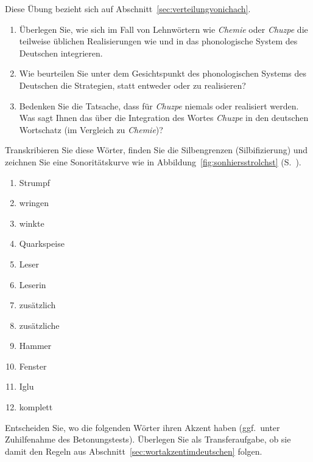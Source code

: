 \Uebung[\tristar] \label{u43} Diese Übung bezieht sich auf Abschnitt~\ref{sec:verteilungvonichach}.

\begin{enumerate}\Lf
  \item Überlegen Sie, wie sich im Fall von Lehnwörtern wie \textit{Chemie} oder \textit{Chuzpe} die teilweise üblichen Realisierungen wie \textipa{[\c{c}emi:]} und \textipa{[XU\t{ts}p@]} in das phonologische System des Deutschen integrieren.
  \item Wie beurteilen Sie unter dem Gesichtspunkt des phonologischen Systems des Deutschen die Strategien, statt \textipa{[\c{c}emi:]} entweder \textipa{[Semi:]} oder \textipa{[kemi:]} zu realisieren?
  \item Bedenken Sie die Tatsache, dass für \textit{Chuzpe} niemals \textipa{[SU\t{ts}p@]} oder \textipa{[kU\t{ts}p@]} realisiert werden.
    Was sagt Ihnen das über die Integration des Wortes \textit{Chuzpe} in den deutschen Wortschatz (im Vergleich zu \textit{Chemie})?
\end{enumerate}

\Uebung \label{u44} Transkribieren Sie diese Wörter, finden Sie die Silbengrenzen (Silbifizierung) und zeichnen Sie eine Sonoritätskurve wie in Abbildung~\ref{fig:sonhiersstrolchst} (S.~\pageref{fig:sonhiersstrolchst}).

\begin{enumerate}\Lf
  \item Strumpf
  \item wringen
  \item winkte
  \item Quarkspeise
  \item Leser
  \item Leserin
  \item zusätzlich
  \item zusätzliche
  \item Hammer
  \item Fenster
  \item Iglu
  \item komplett
\end{enumerate}

\Uebung \label{u45} Entscheiden Sie, wo die folgenden Wörter ihren Akzent haben (ggf.\ unter Zuhilfenahme des Betonungstests).
Überlegen Sie als Transferaufgabe, ob sie damit den Regeln aus Abschnitt~\ref{sec:wortakzentimdeutschen} folgen.

